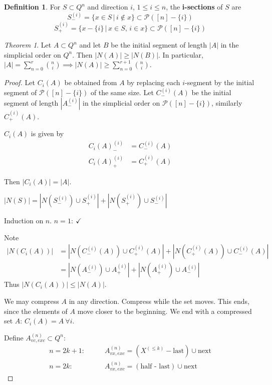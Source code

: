 \documentclass[a4paper]{article}
\theoremstyle{definition}
\newtheorem*{definition}{Definition}
\theoremstyle{remark}
\theoremstyle{default}
\newtheorem{theorem}{Theorem}
\newcommand*\abs[1]{\left|#1\right|}
\begin{document}
\begin{definition}
	For $S \subset Q^n$ and direction $i$,
	$1 \leq i \leq n$, the \textbf{i-sections} of $S$ are
	$$S_-^{(i)} = \{x \in S \,|\, i \not\in x \} \subset \mathcal{P}([n]-\{i\})$$
	$$S_+^{(i)} = \{x - \{i\} \,|\, x \in S,\, i \in x \} \subset \mathcal{P}([n]-\{i\})$$
\end{definition}
\begin{theorem}
	Let $A \subset Q^n$ and let $B$ be the initial segment of length $\abs{A}$ in the simplicial order on $Q^n$.
	Then $\abs{N(A)} \geq \abs{N(B)}$.
	In particular, $\abs{A} = \sum_{n=0}^r {n \choose i} \implies \abs{N(A)} \geq \sum_{n=0}^{r+1} {n \choose i}$.
\end{theorem}
\begin{proof}\renewcommand{\qedsymbol}{}
	Let $C_i(A)$ be obtained from $A$ by replacing each $i$-segment by the initial segment of $\mathcal{P}([n]-\{i\})$ of the same size.
	Let $C_-^{(i)}(A)$ be the initial segment of length $\abs{A_-^{(i)}}$ in the simplicial order on $\mathcal{P}([n]-\{i\})$,
	similarly $C_+^{(i)}(A)$.
	
	$C_i(A)$ is given by
	\begin{align*}
		C_i(A)_-^{(i)} &= C_-^{(i)}(A) \\
		C_i(A)_+^{(i)} &= C_+^{(i)}(A)
	\end{align*}
	
	Then $\abs{C_i(A)} = \abs{A}$.
	
	$\abs{N(S)} = \abs{N(S_-^{(i)}) \cup S_+^{(i)}} + \abs{N(S_+^{(i)}) \cup S_-^{(i)}}$
	
	Induction on $n$. $n=1:\ \checkmark$
	
	Note
	\begin{align*}
		\abs{N(C_i(A))} &= \abs{N(C_-^{(i)}(A)) \cup C_+^{(i)}(A)} + \abs{N(C_+^{(i)}(A)) \cup C_-^{(i)}(A)} \\
		&= \abs{N(A_-^{(i)}) \cup A_+^{(i)}} + \abs{N(A_+^{(i)}) \cup A_-^{(i)}}
	\end{align*}
	Thus $\abs{N(C_i(A))} \leq \abs{N(A)}$.
	
	We may compress $A$ in any direction.
	Compress while the set moves.
	This ends, since the elements of $A$ move closer to the beginning.
	We end with a compressed set $A$: $C_i(A) = A\ \forall i$.
	
	Define $A^{(n)}_{vc, exc} \subset Q^n$:
	\begin{align*}
		n=2k+1:\qquad & A^{(n)}_{vx, exc} = (X^{(\leq k)} - \text{last}) \cup \text{next} \\
		n=2k:\qquad &A^{(n)}_{vx, exc} = (\text{half - last}) \cup \text{next}
	\end{align*}
\end{proof}
\end{document}
